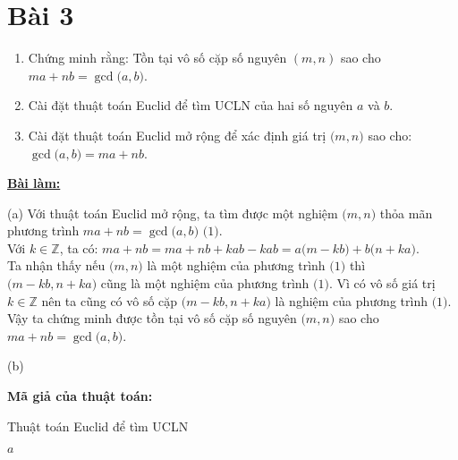 \section*{Bài 3}

\begin{enumerate}[label=(\alph*)]
\item Chứng minh rằng: Tồn tại vô số cặp số nguyên $(m, n)$ sao cho $ma + nb = \gcd \big( a, b \big)$.
\item Cài đặt thuật toán Euclid để tìm UCLN của hai số nguyên $a$ và $b$.
\item Cài đặt thuật toán Euclid mở rộng để xác định giá trị $\big( m, n \big)$ sao cho: $\gcd \big( a, b \big) = ma + nb$.
\end{enumerate}


\centering
\textbf{\underline{Bài làm:}}
\justifying

(a) Với thuật toán Euclid mở rộng, ta tìm được một nghiệm $\big(m, n \big)$ thỏa mãn phương trình $ma + nb = \gcd \big(a, b \big)$ $\big( 1 \big)$.\\
Với $k \in \mathbb{Z}$, ta có: $ma + nb = ma + nb + kab - kab = a \big( m - kb \big) + b \big( n + ka \big)$.\\
Ta nhận thấy nếu $\big( m, n \big)$ là một nghiệm của phương trình $\big( 1 \big)$ thì $\big( m - kb, n + ka \big)$ cũng là một nghiệm của phương trình $\big( 1 \big)$. Vì có vô số giá trị $k \in \mathbb{Z}$ nên ta cũng có vô số cặp $\big( m - kb, n + ka \big)$ là nghiệm của phương trình $\big( 1 \big)$.\\
Vậy ta chứng minh được tồn tại vô số cặp số nguyên $\big(m, n \big)$ sao cho $ma + nb =  \gcd \big(a, b \big)$.

(b)

\textbf{Mã giả của thuật toán:}
\begin{algorithm}
\renewcommand{\algorithmcfname}{Thuật toán}

\caption{Thuật toán Euclid để tìm UCLN}
\SetAlgoNoEnd\SetAlgoNoLine%

\Return $a$
\end{algorithm}


